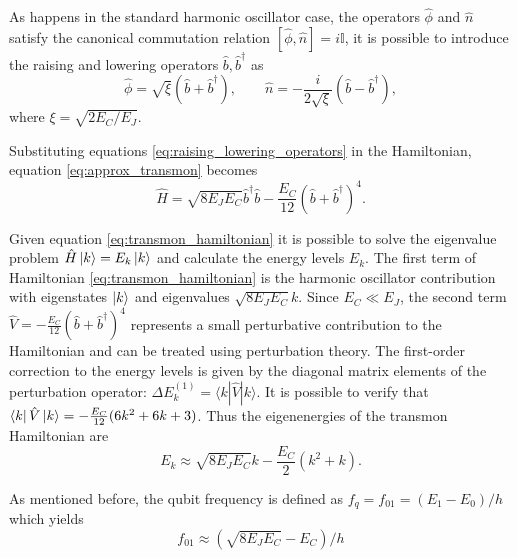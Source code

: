 As happens in the standard harmonic oscillator case, the operators $\hat{\phi}$ and $\hat{n}$ satisfy the canonical commutation relation $[\hat{\phi},\hat{n}]=i\mathbb{I}$, it is possible to introduce the raising and lowering operators $\hat{b},\hat{b}^\dagger$ as
\begin{equation}\label{eq:raising_lowering_operators}
    \hat{\phi} = \sqrt{\xi}(\hat{b}+\hat{b}^\dagger), \quad\quad \hat{n} = -\frac{i}{2\sqrt{\xi}}(\hat{b}-\hat{b}^\dagger),
\end{equation}
where $\xi =  \sqrt{2E_C/E_J}$.

Substituting equations \ref{eq:raising_lowering_operators} in the Hamiltonian, equation \ref{eq:approx_transmon} becomes
\begin{equation}\label{eq:transmon_hamiltonian}
    \hat{H} = \sqrt{8E_JE_C}\hat{b}^\dagger\hat{b} - \frac{E_C}{12}(\hat{b}+\hat{b}^\dagger)^4.
\end{equation}

Given equation \ref{eq:transmon_hamiltonian} it is possible to solve the eigenvalue problem $\hat{H}\ket{k}=E_k\ket{k}$ and calculate the energy levels $E_k$.
The first term of Hamiltonian \ref{eq:transmon_hamiltonian} is the harmonic oscillator contribution with eigenstates $\ket{k}$ and eigenvalues $\sqrt{8E_JE_C}k$. 
Since $E_C \ll E_J$, the second term $ \hat{V} = -\frac{E_C}{12}(\hat{b} + \hat{b}^\dagger)^4$ represents a small perturbative contribution to the Hamiltonian and can be treated using perturbation theory. 
The first-order correction to the energy levels is given by the diagonal matrix elements of the perturbation operator: $\Delta E_k^{(1)} = \langle k | \hat{V} | k \rangle$.
It is possible to verify that $\bra{k} \hat{V} \ket{k} = -\frac{E_C}{12} (6k^2 + 6k + 3)$. 
Thus the eigenenergies of the transmon Hamiltonian are 
\begin{equation}
    E_k \approx \sqrt{8E_JE_C}k - \frac{E_C}{2}(k^2 + k).
\end{equation}

As mentioned before, the qubit frequency is defined as $f_q = f_{01} = (E_1 - E_0)/h$ which yields
\begin{equation}
    f_01 \approx (\sqrt{8E_JE_C} - E_C)/h
\end{equation}

